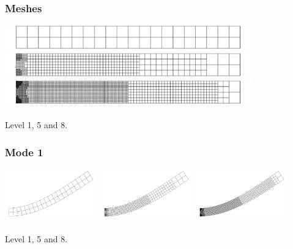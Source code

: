 \documentclass{beamer}
\begin{document}
\begin{frame}
  \frametitle{Meshes}

  \begin{center}
    \includegraphics[width=0.8\textwidth]{beam/00-mesh} \\
    \vspace{0.3cm} \includegraphics[width=0.8\textwidth]{beam/04-mesh} \\
    \vspace{0.3cm} \includegraphics[width=0.8\textwidth]{beam/07-mesh}
    \\~\\
    Level 1, 5 and 8.
  \end{center}
\end{frame}

\begin{frame}
  \frametitle{Mode 1}

  \begin{center}
    \includegraphics[width=0.3\textwidth]{beam/mode-00-00}
    \includegraphics[width=0.3\textwidth]{beam/mode-04-00}
    \includegraphics[width=0.3\textwidth]{beam/mode-07-00}
   \\~\\
   Level 1, 5 and 8.
  \end{center}
\end{frame}
\end{document}
